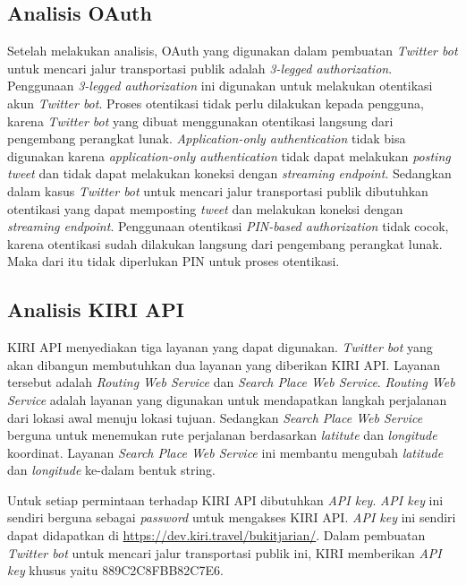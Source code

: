 \subsection{Analisis OAuth}
Setelah melakukan analisis, OAuth yang digunakan dalam pembuatan \textit{Twitter bot} untuk mencari jalur transportasi publik adalah \textit{3-legged authorization}. Penggunaan \textit{3-legged authorization} ini digunakan untuk melakukan otentikasi akun \textit{Twitter bot}. Proses otentikasi tidak perlu dilakukan kepada pengguna, karena \textit{Twitter bot} yang dibuat menggunakan otentikasi langsung dari pengembang perangkat lunak. \textit{Application-only authentication} tidak bisa digunakan karena \textit{application-only authentication} tidak dapat melakukan \textit{posting} \textit{tweet} dan tidak dapat melakukan koneksi dengan \textit{streaming endpoint}. Sedangkan dalam kasus \textit{Twitter bot} untuk mencari jalur transportasi publik dibutuhkan otentikasi yang dapat memposting \textit{tweet} dan melakukan koneksi dengan \textit{streaming endpoint}. Penggunaan otentikasi \textit{PIN-based authorization} tidak cocok, karena otentikasi sudah dilakukan langsung dari pengembang perangkat lunak. Maka dari itu tidak diperlukan PIN untuk proses otentikasi.

\subsection{Analisis KIRI API}
KIRI API menyediakan tiga layanan yang dapat digunakan. \textit{Twitter bot} yang akan dibangun membutuhkan dua layanan yang diberikan KIRI API. Layanan tersebut adalah \textit{Routing Web Service} dan \textit{Search Place Web Service}. \textit{Routing Web Service} adalah layanan yang digunakan untuk mendapatkan langkah perjalanan dari lokasi awal menuju lokasi tujuan. Sedangkan \textit{Search Place Web Service} berguna untuk menemukan rute perjalanan berdasarkan \textit{latitute} dan \textit{longitude} koordinat. Layanan \textit{Search Place Web Service} ini membantu mengubah \textit{latitude} dan \textit{longitude} ke-dalam bentuk string.

Untuk setiap permintaan terhadap KIRI API dibutuhkan \textit{API key}. \textit{API key} ini sendiri berguna sebagai \textit{password} untuk mengakses KIRI API. \textit{API key} ini sendiri dapat didapatkan di \url{https://dev.kiri.travel/bukitjarian/}. Dalam pembuatan \textit{Twitter bot} untuk mencari jalur transportasi publik ini, KIRI memberikan \textit{API key} khusus yaitu 889C2C8FBB82C7E6.

